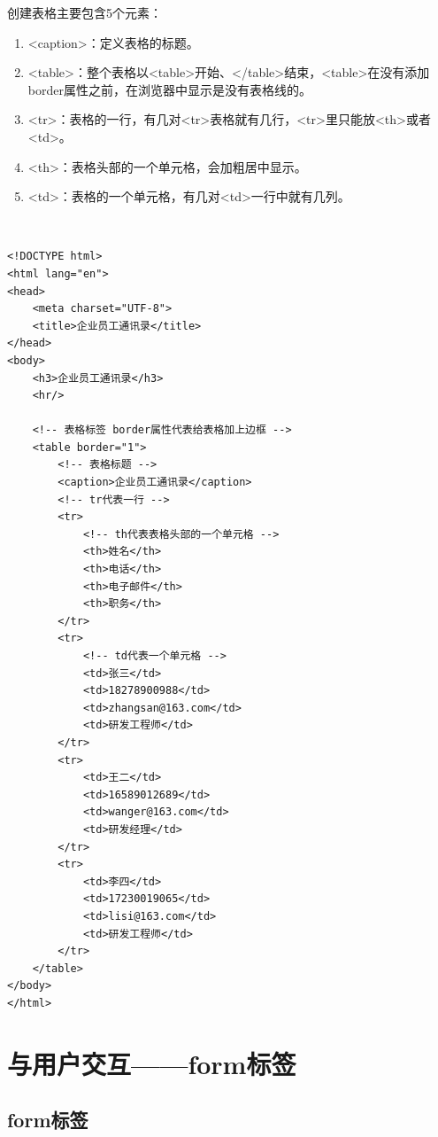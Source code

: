 创建表格主要包含5个元素：

\begin{enumerate}
	\item <caption>：定义表格的标题。

	\item <table>：整个表格以<table>开始、</table>结束，<table>在没有添加border属性之前，在浏览器中显示是没有表格线的。

	\item <tr>：表格的一行，有几对<tr>表格就有几行，<tr>里只能放<th>或者<td>。

	\item <th>：表格头部的一个单元格，会加粗居中显示。

	\item <td>：表格的一个单元格，有几对<td>一行中就有几列。
\end{enumerate}

 \\

\begin{lstlisting}[style=htmlcssjs]
<!DOCTYPE html>
<html lang="en">
<head>
    <meta charset="UTF-8">
    <title>企业员工通讯录</title>
</head>
<body>
    <h3>企业员工通讯录</h3>
    <hr/>

    <!-- 表格标签 border属性代表给表格加上边框 -->
    <table border="1">
        <!-- 表格标题 -->
        <caption>企业员工通讯录</caption>
        <!-- tr代表一行 -->
        <tr>
            <!-- th代表表格头部的一个单元格 -->
            <th>姓名</th>
            <th>电话</th>
            <th>电子邮件</th>
            <th>职务</th>
        </tr>
        <tr>
            <!-- td代表一个单元格 -->
            <td>张三</td>
            <td>18278900988</td>
            <td>zhangsan@163.com</td>
            <td>研发工程师</td>
        </tr>
        <tr>
            <td>王二</td>
            <td>16589012689</td>
            <td>wanger@163.com</td>
            <td>研发经理</td>
        </tr>
        <tr>
            <td>李四</td>
            <td>17230019065</td>
            <td>lisi@163.com</td>
            <td>研发工程师</td>
        </tr>
    </table>
</body>
</html>
\end{lstlisting}

\newpage

\section{与用户交互——form标签}

\subsection{form标签}

